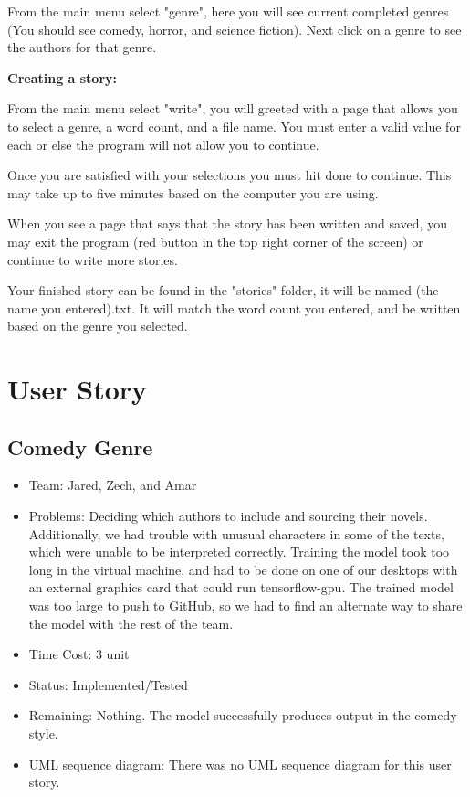 \documentclass[12pt]{article}
\begin{document}
From the main menu select "genre", here you will see current completed genres (You should see comedy, horror, and science fiction).
Next click on a genre to see the authors for that genre. 

\textbf{Creating a story:}

From the main menu select "write", you will greeted with a page that allows you to select a genre, a word count, and a file name. You must enter a valid value for each or else the program will not allow you to continue. 

Once you are satisfied with your selections you must hit done to continue. This may take up to five minutes based on the computer you are using.

When you see a page that says that the story has been written and saved, you may exit the program (red button in the top right corner of the screen) or continue to write more stories. 

Your finished story can be found in the "stories" folder, it will be named (the name you entered).txt. It will match the word count you entered, and be written based on the genre you selected. 

\section{User Story}

\subsection{Comedy Genre}
\begin{itemize}
\item Team: Jared, Zech, and Amar
\item Problems: Deciding which authors to include and sourcing their novels. Additionally, we had trouble with unusual characters in some of the texts, which were unable to be interpreted correctly. Training the model took too long in the virtual machine, and had to be done on one of our desktops with an external graphics card that could run tensorflow-gpu. The trained model was too large to push to GitHub, so we had to find an alternate way to share the model with the rest of the team.
\item Time Cost: 3 unit 
\item Status: Implemented/Tested
\item Remaining: Nothing. The model successfully produces output in the comedy style.
\item UML sequence diagram: There was no UML sequence diagram for this user story.
\end{itemize}
\end{document}
